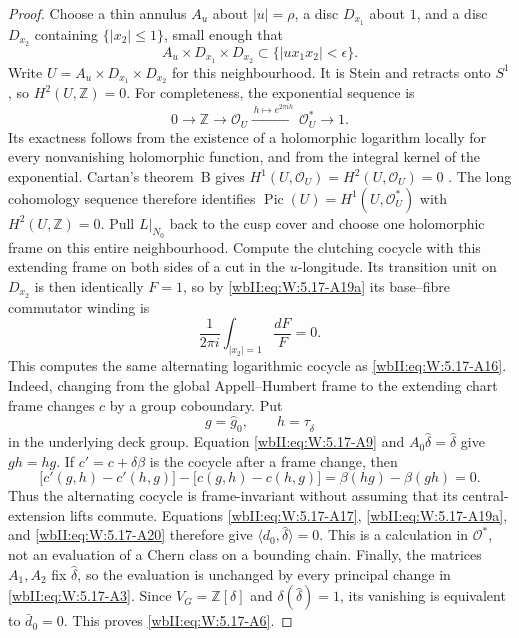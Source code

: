 \begin{proof}
Choose a thin annulus \(A_u\) about \(|u|=\rho\), a disc \(D_{x_1}\)
about \(1\), and a disc \(D_{x_2}\) containing \(\{|x_2|\le1\}\), small
enough that
\[
 A_u\times D_{x_1}\times D_{x_2}
 \subset\{|ux_1x_2|<\epsilon\}.
\tag{W.119}\label{wbII:eq:W:5.17-A19c}
\]
Write \(U=A_u\times D_{x_1}\times D_{x_2}\) for this neighbourhood.
It is Stein and retracts onto \(S^1\), so \(H^2(U,\mathbb Z)=0\).
For completeness, the exponential sequence is
\[
0\longrightarrow\mathbb Z\longrightarrow\mathcal O_U
 \xrightarrow{\,h\mapsto e^{2\pi i h}\,}\mathcal O_U^*
 \longrightarrow1.
\]
Its exactness follows from the existence of a holomorphic logarithm locally
for every nonvanishing holomorphic function, and from the integral kernel
of the exponential. Cartan's theorem~B gives
\(H^1(U,\mathcal O_U)=H^2(U,\mathcal O_U)=0\)
\cite[\S2, fundamental theorem~B, p.~80]{Cartan1957}.
The long cohomology sequence therefore identifies
\(\operatorname{Pic}(U)=H^1(U,\mathcal O_U^*)\) with
\(H^2(U,\mathbb Z)=0\). Pull \(L|_{N_0}\) back to
the cusp cover and choose one holomorphic frame on this entire
neighbourhood.  Compute the clutching cocycle with this extending frame on
both sides of a cut in the \(u\)-longitude.  Its transition unit on
\(D_{x_2}\) is then identically \(F=1\), so by \eqref{wbII:eq:W:5.17-A19a} its
base--fibre commutator winding is
\[
 \frac1{2\pi i}\int_{|x_2|=1}\frac{dF}{F}=0.
\tag{W.120}\label{wbII:eq:W:5.17-A20}
\]
This computes the same alternating logarithmic cocycle as \eqref{wbII:eq:W:5.17-A16}.
Indeed, changing from the global Appell--Humbert frame to the extending
chart frame changes \(c\) by a group coboundary.  Put
\[
 g=\widehat g_0,
 \qquad
 h=\tau_{\widehat\delta}
\]
in the underlying deck group.  Equation \eqref{wbII:eq:W:5.17-A9} and
\(A_0\widehat\delta=\widehat\delta\) give \(gh=hg\).  If
\(c'=c+\delta\beta\) is the cocycle after a frame change, then
\[
 \bigl[c'(g,h)-c'(h,g)\bigr]
 -\bigl[c(g,h)-c(h,g)\bigr]
 =\beta(hg)-\beta(gh)=0.
\]
Thus the alternating cocycle is frame-invariant without assuming that its
central-extension lifts commute.  Equations \eqref{wbII:eq:W:5.17-A17}, \eqref{wbII:eq:W:5.17-A19a}, and
\eqref{wbII:eq:W:5.17-A20} therefore give
\(\langle d_0,\widehat\delta\rangle=0\).  This is a calculation in
\(\mathcal O^*\), not an evaluation of a Chern class on a bounding chain.
Finally, the matrices \(A_1,A_2\) fix
\(\widehat\delta\), so the evaluation is unchanged by every principal
change in \eqref{wbII:eq:W:5.17-A3}.  Since
\(V_G=\mathbb Z[\delta]\) and
\(\delta(\widehat\delta)=1\), its vanishing is equivalent to
\(\bar d_0=0\).  This proves \eqref{wbII:eq:W:5.17-A6}.
\end{proof}

